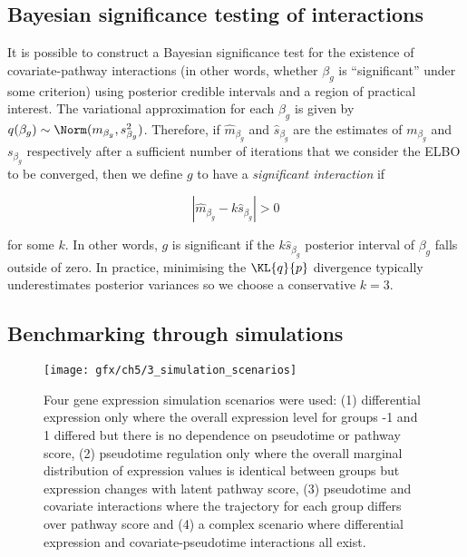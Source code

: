 \subsection{Bayesian significance testing of interactions}

It is possible to construct a Bayesian significance test for the existence of covariate-pathway interactions (in other words, whether $\beta_g$ is ``significant'' under some criterion) using posterior credible intervals and a region of practical interest. The variational approximation for each $\beta_g$ is given by $q(\beta_g) \sim \Norm(m_{\beta_g}, s^2_{\beta_g})$. Therefore, if $\hat{m}_{\beta_g}$ and $\hat{s}_{\beta_g}$ are the estimates of $m_{\beta_g}$ and $s_{\beta_g}$ respectively after a sufficient number of iterations that we consider the ELBO to be converged, then we define $g$ to have a \emph{significant interaction}
if

\begin{equation}
  | \hat{m}_{\beta_g} - k \hat{s}_{\beta_g} | > 0
\end{equation}

for some $k$. In other words, $g$ is significant if the $k \hat{s}_{\beta_g}$ posterior interval of $\beta_g$ falls outside of zero.  In practice, minimising the $\KL{q}{p}$ divergence typically underestimates posterior variances \citep{blei2016variational} so we choose a conservative $k=3$.

\subsection{Benchmarking through simulations}

\begin{figure}
\centering
  \texttt{[image: gfx/ch5/3\_simulation\_scenarios]}
   \caption{Four gene expression simulation scenarios were used: (1) differential expression only where the overall expression level for groups -1 and 1 differed but there is no dependence on pseudotime or pathway score, (2) pseudotime regulation only where the overall marginal distribution of expression values is identical between groups but expression changes with latent pathway score, (3) pseudotime and covariate interactions where the trajectory for each group differs over pathway score and (4) a complex scenario where differential expression and covariate-pseudotime interactions all exist. } \label{fig:simulation_scenarios}
\end{figure}

